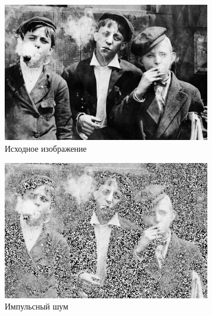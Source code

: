   \begin{figure}[ht] 
    \centering
    \begin{subfigure}[b]{0.5\linewidth}
        \centering
        \includegraphics[width=0.95\linewidth]{../lewis-hine-taschen-main-3.jpg} 
        \caption{Исходное изображение} 
        \label{contraharmonic_1.85:a} 
        \vspace{4ex}
    \end{subfigure}%
    \begin{subfigure}[b]{0.5\linewidth}
      \centering
      \includegraphics[width=0.95\linewidth]{../Contraharmonic_Filter/Contraharmonic_Impulse_noise_(m,n=(3,_3),q=1.85).jpg} 
      \caption{Импульсный шум} 
      \label{contraharmonic_1.85:b} 
      \vspace{4ex}
    \end{subfigure}
    \begin{subfigure}[b]{0.5\linewidth}
      \centering

\end{subfigure}
\end{figure}
